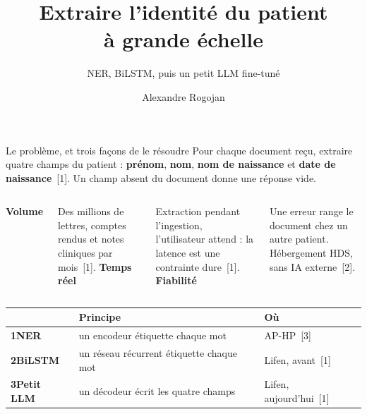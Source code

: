 \documentclass[11pt,aspectratio=169]{beamer}
\title{Extraire l'identité du patient\\ à grande échelle}
\subtitle{NER, BiLSTM, puis un petit LLM fine-tuné}
\author{Alexandre Rogojan}
\institute{Lifen \,·\, stage Machine Learning Engineer \,·\, partie 2}
\date{}
\newcommand{\refs}[1]{{\color{mlblue}[#1]}}
\begin{document}
\begin{frame}[plain]
  \titlepage
\end{frame}

\begin{frame}{Le problème, et trois façons de le résoudre}
  Pour chaque document reçu, extraire quatre champs du patient : \textbf{prénom},
  \textbf{nom}, \textbf{nom de naissance} et \textbf{date de naissance}~\refs{1}. Un champ
  absent du document donne une réponse vide.

  \vspace{0.7em}
  \begin{columns}[T]
    \textbf{Volume}\par\smallskip
    {\small Des millions de lettres, comptes rendus et notes cliniques par mois~\refs{1}.}
    \textbf{Temps réel}\par\smallskip
    {\small Extraction pendant l'ingestion, l'utilisateur attend : la latence est une
    contrainte dure~\refs{1}.}
    \textbf{Fiabilité}\par\smallskip
    {\small Une erreur range le document chez un autre patient. Hébergement HDS, sans IA
    externe~\refs{2}.}
  \end{columns}

  \vspace{0.9em}
  \begin{center}
    \small
    \renewcommand{\arraystretch}{1.15}
    \begin{tabular}{@{}lll@{}}
      \toprule
      & \textbf{Principe} & \textbf{Où} \\
      \midrule
      \textbf{1\quad NER} & un encodeur étiquette chaque mot & AP-HP~\refs{3} \\
      \textbf{2\quad BiLSTM} & un réseau récurrent étiquette chaque mot & Lifen, avant~\refs{1} \\
      \textbf{3\quad Petit LLM} & un décodeur écrit les quatre champs & Lifen, aujourd'hui~\refs{1} \\
      \bottomrule
    \end{tabular}
  \end{center}
\end{frame}
\end{document}
